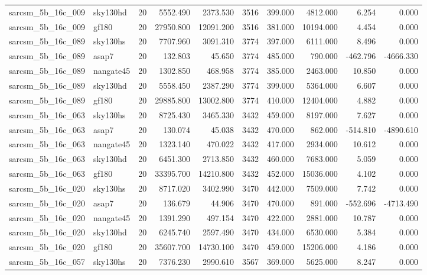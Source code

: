 \begin{tabular}{llrrrrrrrr}
sarcsm\_5b\_16c\_009 & sky130hd & 20 & 5552.490 & 2373.530 & 3516 & 399.000 & 4812.000 & 6.254 & 0.000 \\
sarcsm\_5b\_16c\_009 & gf180 & 20 & 27950.800 & 12091.200 & 3516 & 381.000 & 10194.000 & 4.454 & 0.000 \\
sarcsm\_5b\_16c\_089 & sky130hs & 20 & 7707.960 & 3091.310 & 3774 & 397.000 & 6111.000 & 8.496 & 0.000 \\
sarcsm\_5b\_16c\_089 & asap7 & 20 & 132.803 & 45.650 & 3774 & 485.000 & 790.000 & -462.796 & -4666.330 \\
sarcsm\_5b\_16c\_089 & nangate45 & 20 & 1302.850 & 468.958 & 3774 & 385.000 & 2463.000 & 10.850 & 0.000 \\
sarcsm\_5b\_16c\_089 & sky130hd & 20 & 5558.450 & 2387.290 & 3774 & 399.000 & 5364.000 & 6.607 & 0.000 \\
sarcsm\_5b\_16c\_089 & gf180 & 20 & 29885.800 & 13002.800 & 3774 & 410.000 & 12404.000 & 4.882 & 0.000 \\
sarcsm\_5b\_16c\_063 & sky130hs & 20 & 8725.430 & 3465.330 & 3432 & 459.000 & 8197.000 & 7.627 & 0.000 \\
sarcsm\_5b\_16c\_063 & asap7 & 20 & 130.074 & 45.038 & 3432 & 470.000 & 862.000 & -514.810 & -4890.610 \\
sarcsm\_5b\_16c\_063 & nangate45 & 20 & 1323.140 & 470.022 & 3432 & 417.000 & 2934.000 & 10.612 & 0.000 \\
sarcsm\_5b\_16c\_063 & sky130hd & 20 & 6451.300 & 2713.850 & 3432 & 460.000 & 7683.000 & 5.059 & 0.000 \\
sarcsm\_5b\_16c\_063 & gf180 & 20 & 33395.700 & 14210.800 & 3432 & 452.000 & 15036.000 & 4.102 & 0.000 \\
sarcsm\_5b\_16c\_020 & sky130hs & 20 & 8717.020 & 3402.990 & 3470 & 442.000 & 7509.000 & 7.742 & 0.000 \\
sarcsm\_5b\_16c\_020 & asap7 & 20 & 136.679 & 44.906 & 3470 & 470.000 & 891.000 & -552.696 & -4713.490 \\
sarcsm\_5b\_16c\_020 & nangate45 & 20 & 1391.290 & 497.154 & 3470 & 422.000 & 2881.000 & 10.787 & 0.000 \\
sarcsm\_5b\_16c\_020 & sky130hd & 20 & 6245.740 & 2597.490 & 3470 & 434.000 & 6530.000 & 5.384 & 0.000 \\
sarcsm\_5b\_16c\_020 & gf180 & 20 & 35607.700 & 14730.100 & 3470 & 459.000 & 15206.000 & 4.186 & 0.000 \\
sarcsm\_5b\_16c\_057 & sky130hs & 20 & 7376.230 & 2990.610 & 3567 & 369.000 & 5625.000 & 8.247 & 0.000 \\

\end{tabular}
